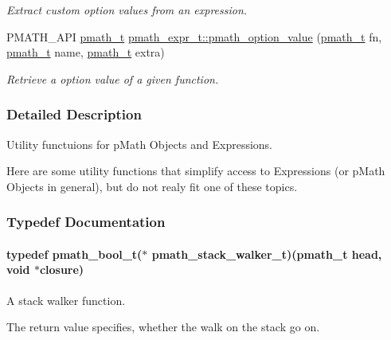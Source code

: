 \begin{CompactItemize}
\begin{CompactList}\small\item\em Extract custom option values from an expression. \item\end{CompactList}\item 
PMATH\_\-API \hyperlink{classpmath__t}{pmath\_\-t} \hyperlink{group__helpers_gc244ab0720278b396976728a39f8bde6}{pmath\_\-expr\_\-t::pmath\_\-option\_\-value} (\hyperlink{classpmath__t}{pmath\_\-t} fn, \hyperlink{classpmath__t}{pmath\_\-t} name, \hyperlink{classpmath__t}{pmath\_\-t} extra)
\begin{CompactList}\small\item\em Retrieve a option value of a given function. \item\end{CompactList}\end{CompactItemize}


\subsubsection{Detailed Description}
Utility functuions for pMath Objects and Expressions. 

Here are some utility functions that simplify access to Expressions (or pMath Objects in general), but do not realy fit one of these topics. 

\subsubsection{Typedef Documentation}
\hypertarget{group__helpers_g11afc6451921f3169224096723483c64}{
\paragraph[{pmath\_\-stack\_\-walker\_\-t}]{\setlength{\rightskip}{0pt plus 5cm}typedef {\bf pmath\_\-bool\_\-t}($\ast$ {\bf pmath\_\-stack\_\-walker\_\-t})({\bf pmath\_\-t} head, void $\ast$closure)}\hfill}
\label{group__helpers_g11afc6451921f3169224096723483c64}


A stack walker function. 

The return value specifies, whether the walk on the stack go on. 

